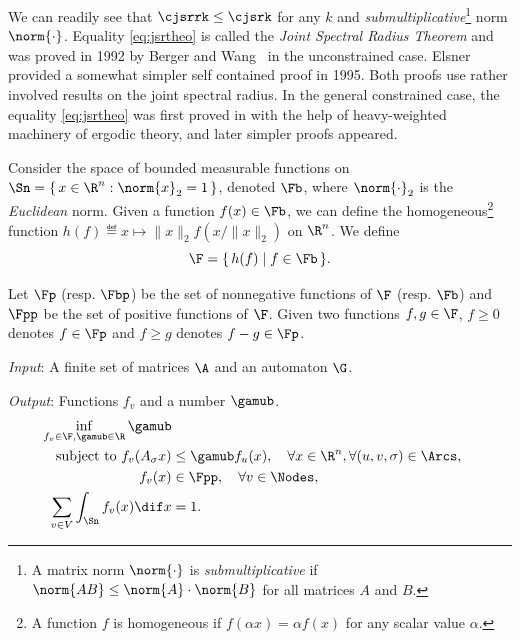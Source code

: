 \documentclass[11pt,twoside,a4paper,openright]{uclouvain-thesis}
\newcommand{\implementations}[1]{}
\begin{document}
We can readily see that
\(
  \cjsrrk \leq \cjsrk
\)
for any $k$ and \emph{submultiplicative}\footnote{A matrix norm $\norm{\cdot}$ is \emph{submultiplicative} if $\norm{AB} \leq \norm{A} \cdot \norm{B}$ for all matrices $A$ and $B$.} norm $\norm{\cdot}$.
Equality \eqref{eq:jsrtheo} is called the \emph{Joint Spectral Radius Theorem} and was proved in 1992 by Berger and Wang~\cite{berger1992bounded} in the unconstrained case.
Elsner~\cite{elsner1995generalized} provided a somewhat simpler self contained proof in 1995.
Both proofs use rather involved results on the joint spectral radius.
In the general constrained case, the equality \eqref{eq:jsrtheo}
was first proved in \cite{dai2012gel} with the help of heavy-weighted machinery
of ergodic theory, and later simpler proofs appeared.







\implementations{\jlpkg{SetProg}.}


Consider the space of bounded measurable
functions on $\Sn = \{\, x \in \R^n : \norm{x}_2 = 1 \,\}$, denoted $\Fb$, where $\norm{\cdot}_2$ is the \emph{Euclidean} norm.
Given a function $f(x) \in \Fb$, we can define the homogeneous\footnote{A function $f$ is homogeneous if $f(\alpha x) = \alpha f(x)$ for any scalar value $\alpha$.}
function $h(f) \eqdef x \mapsto \|x\|_2f(x/\|x\|_2)$ on $\R^n$.
We define
\begin{equation}
  \label{eq:homfun}
  \F = \{\, h(f) \mid f \in \Fb \,\}.
\end{equation}

Let $\Fp$ (resp. $\Fbp$) be the set of nonnegative functions of $\F$ (resp. $\Fb$)
and $\Fpp$ be the set of positive functions of $\F$.
Given two functions $f, g \in \F$, $f \geq 0$ denotes $f \in \Fp$ and $f \geq g$ denotes $f - g \in \Fp$.

\begin{myprog}[Primal]
  \label{prog:primalinf}

  \emph{Input}: A finite set of matrices $\A$ and an automaton $\G$.

  \emph{Output}: Functions $f_v$ and a number $\gamub$.
  \begin{align}
    \notag
    \inf_{f_v \in \F, \gamub \in \R} \gamub\\
    \label{eq:primalinf1}
    \text{subject to }f_v(A_\sigma x) & \leq \gamub f_u(x), \quad \forall x \in \R^n, \forall (u, v, \sigma) \in \Arcs,\\
    \notag
    f_v(x) & \in \Fpp, \quad \forall v \in \Nodes,\\
    \label{eq:primalinf3}
    \sum_{v \in V} \int_{\Sn} f_v(x) \dif x & = 1.
  \end{align}
\end{myprog}
\end{document}

